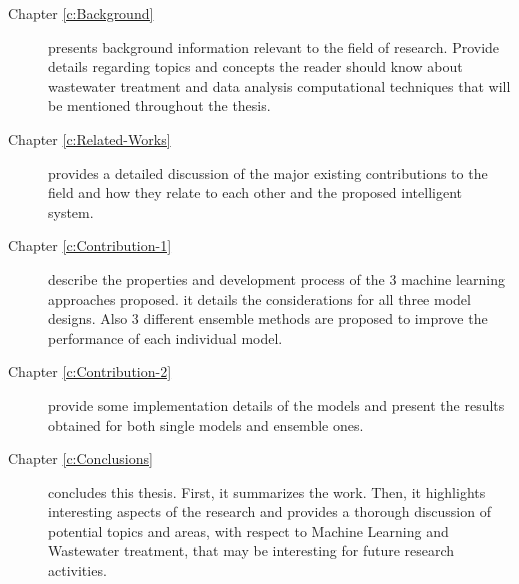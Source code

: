 \begin{description}

  \item[Chapter \ref{c:Background}] presents background information relevant to the field of research. Provide details regarding topics and concepts the reader should know about wastewater treatment and data analysis computational techniques that will be mentioned throughout the thesis.
  
  \item[Chapter \ref{c:Related-Works}] provides a detailed discussion of the major existing contributions to the field and how they relate to each other and the proposed intelligent system.
  
  \item[Chapter \ref{c:Contribution-1}] describe the properties and development process of the 3 machine learning approaches proposed. it details the considerations for all three model designs. Also 3 different ensemble methods are proposed to improve the performance of each individual model.
  
  \item[Chapter \ref{c:Contribution-2}] provide some implementation details of the models and present the results obtained for both single models and ensemble ones. 
  
  
  \item[Chapter \ref{c:Conclusions}] concludes this thesis. First, it summarizes the work. Then, it highlights interesting aspects of the research and provides a thorough discussion of potential topics and areas, with respect to Machine Learning and Wastewater treatment, that may be interesting for future research activities. 
  
\end{description}



